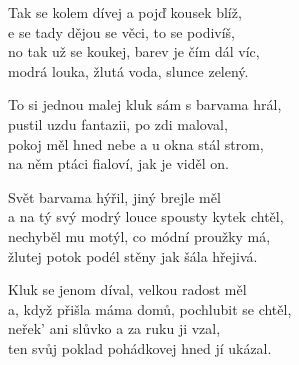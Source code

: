 
\cho{}
Tak se kolem dívej a pojď kousek blíž,\\
e se tady dějou se věci, to se podivíš,\\
no tak už se koukej, barev je čím dál víc,\\
modrá louka, žlutá voda, slunce zelený.

\ve{}
To si jednou malej kluk sám s barvama hrál,\\
pustil uzdu fantazii, po zdi maloval,\\
pokoj měl hned nebe a u okna stál strom,\\
na něm ptáci fialoví, jak je viděl on.

\cho{}

\ve
Svět barvama hýřil, jiný brejle měl\\
a na tý svý modrý louce spousty kytek chtěl,\\
nechyběl mu motýl, co módní proužky má,\\
žlutej potok podél stěny jak šála hřejivá.\\

\cho{}

\ve
Kluk se jenom díval, velkou radost měl\\
a, když přišla máma domů, pochlubit se chtěl,\\
neřek' ani slůvko a za ruku ji vzal,\\
ten svůj poklad pohádkovej hned jí ukázal.\\

\cho{}

\esong